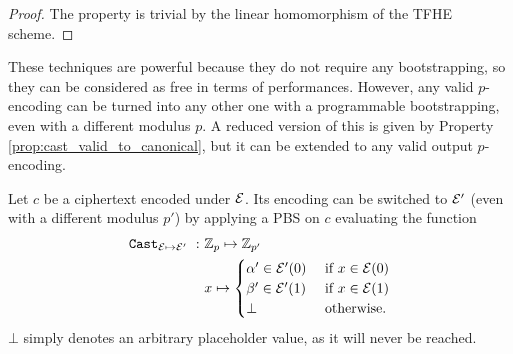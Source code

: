 \begin{proof}
    The property is trivial by the linear homomorphism of the TFHE scheme.
\end{proof} 

These techniques are powerful because they do not require any bootstrapping, so they can be considered as free in terms of performances. However, any valid $p$-encoding can be turned into any other one with a programmable bootstrapping, even with a different modulus $p$. A reduced version of this is given by Property \ref{prop:cast_valid_to_canonical}, but it can be extended to any valid output $p$-encoding.

\begin{property} 
    Let $c$ be a ciphertext encoded under $\mathcal{E}$. Its encoding can be switched to $\mathcal{E}'$ (even with a different modulus $p'$) by applying a PBS on $c$ evaluating the function     \begin{align}
        \texttt{Cast}_{\mathcal{E} \mapsto \mathcal{E}'}~:~& \mathbb{Z}_p \mapsto \mathbb{Z}_{p'}\\
        & x \mapsto \begin{cases}
                        \alpha' \in \mathcal{E}'(0) & \text{ if } x \in \mathcal{E}(0)\\
                        \beta' \in \mathcal{E}'(1) & \text{ if } x \in \mathcal{E}(1)\\
                        \bot & \text{ otherwise.}
                    \end{cases}
    \end{align}
    $\bot$ simply denotes an arbitrary placeholder value, as it will never be reached.
    \label{prop:enc_switch_pbs}
\end{property} 




